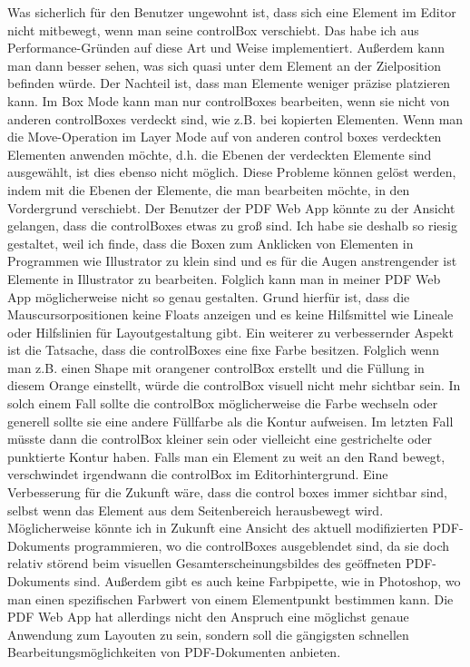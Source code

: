 Was sicherlich für den Benutzer ungewohnt ist, dass sich eine Element im Editor nicht mitbewegt, wenn man seine controlBox verschiebt. Das habe ich aus Performance-Gründen auf diese Art und Weise implementiert. Außerdem kann man dann besser sehen, was sich quasi unter dem Element an der Zielposition befinden würde. Der Nachteil ist, dass man Elemente weniger präzise platzieren kann. Im Box Mode kann man nur controlBoxes bearbeiten, wenn sie nicht von anderen controlBoxes verdeckt sind, wie z.B. bei kopierten Elementen. Wenn man die Move-Operation im Layer Mode auf von anderen control boxes verdeckten Elementen anwenden möchte, d.h. die Ebenen der verdeckten Elemente sind ausgewählt, ist dies ebenso nicht möglich. Diese Probleme können gelöst werden, indem mit die Ebenen der Elemente, die man bearbeiten möchte, in den Vordergrund verschiebt. Der Benutzer der PDF Web App könnte zu der Ansicht gelangen, dass die controlBoxes etwas zu groß sind. Ich habe sie deshalb so riesig gestaltet, weil ich finde, dass die Boxen zum Anklicken von Elementen in Programmen wie Illustrator zu klein sind und es für die Augen anstrengender ist Elemente in Illustrator zu bearbeiten. Folglich kann man in meiner PDF Web App möglicherweise nicht so genau gestalten. Grund hierfür ist, dass die Mauscursorpositionen keine Floats anzeigen und es keine Hilfsmittel wie Lineale oder Hilfslinien für Layoutgestaltung gibt. Ein weiterer zu verbessernder Aspekt ist die Tatsache, dass die controlBoxes eine fixe Farbe besitzen. Folglich wenn man z.B. einen Shape mit orangener controlBox erstellt und die Füllung in diesem Orange einstellt, würde die controlBox visuell nicht mehr sichtbar sein. In solch einem Fall sollte die controlBox möglicherweise die Farbe wechseln oder generell sollte sie eine andere Füllfarbe als die Kontur aufweisen. Im letzten Fall müsste dann die controlBox kleiner sein oder vielleicht eine gestrichelte oder punktierte Kontur haben. Falls man ein Element zu weit an den Rand bewegt, verschwindet irgendwann die controlBox im Editorhintergrund. Eine Verbesserung für die Zukunft wäre, dass die control boxes immer sichtbar sind, selbst wenn das Element aus dem Seitenbereich herausbewegt wird. Möglicherweise könnte ich in Zukunft eine Ansicht des aktuell modifizierten PDF-Dokuments programmieren, wo die controlBoxes ausgeblendet sind, da sie doch relativ störend beim visuellen Gesamterscheinungsbildes des geöffneten PDF-Dokuments sind. Außerdem gibt es auch keine Farbpipette, wie in Photoshop, wo man einen spezifischen Farbwert von einem Elementpunkt bestimmen kann. Die PDF Web App hat allerdings nicht den Anspruch eine möglichst genaue Anwendung zum Layouten zu sein, sondern soll die gängigsten schnellen Bearbeitungsmöglichkeiten von PDF-Dokumenten anbieten.
